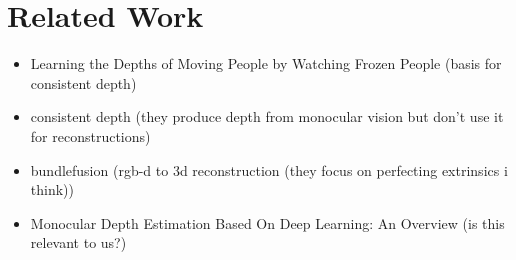 \chapter{Related Work}
    \begin{itemize}
        \item Learning the Depths of Moving People by Watching Frozen People (basis for consistent depth)
        \item consistent depth (they produce depth from monocular vision but don't use it for reconstructions)
        \item bundlefusion (rgb-d to 3d reconstruction (they focus on perfecting extrinsics i think))
        \item Monocular Depth Estimation Based On Deep
        Learning: An Overview (is this relevant to us?)
    \end{itemize}